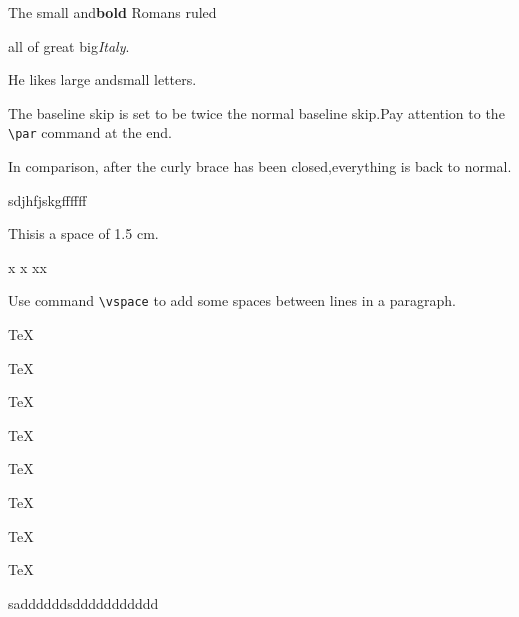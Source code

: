 \documentclass[letterpaper]{article}
\begin{document}
	{\small The small and\textbf{bold} Romans ruled}
	\par 
	{\Large all of great big{\itshape Italy}.}
	
	
	He likes {\LARGE large and{\small small} letters}.
	
	{\linespread{2.0}\selectfont The baseline skip is set to be twice the normal baseline skip.Pay attention to the \verb|\par| command at the end. \par}
	In comparison, after the curly brace has been closed,everything is back to normal.\par 

	\noindent sdjhfjskgffffff

	This\hspace{1.5cm}is a space of 1.5 cm.

	x
	x
	x\hspace{\fill}x

	Use command \verb|\vspace| to add \vspace{12pt} some spaces between lines in a paragraph.
	\parbox[t]{3em}{TeX\par TeX}	%
	\parbox[t]{3em}{TeX\par\smallskip TeX}
	\parbox[t]{3em}{TeX\par\medskip TeX}
	\parbox[t]{3em}{TeX\par\bigskip TeX}

	\twocolumn
	sadddddd\newpage sddddddddddd
	\thispagestyle{empty}
\end{document}
